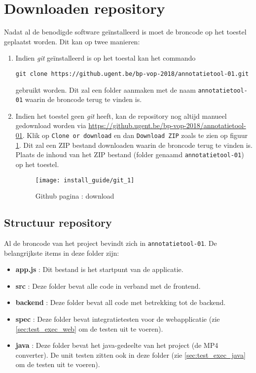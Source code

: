 \section{Downloaden repository}
\label{sec:download_repository}
Nadat al de benodigde software ge\"installeerd is moet de broncode op het toestel geplaatst worden. Dit kan op twee manieren:
\begin{enumerate}
    \item Indien \textit{git} ge\"installeerd is op het toestal kan het commando 
    
    \texttt{git clone https://github.ugent.be/bp-vop-2018/annotatietool-01.git} 
    
    gebruikt worden. Dit zal een folder aanmaken met de naam \texttt{annotatietool-01} waarin de broncode terug te vinden is.
    
    \item Indien het toestel geen \textit{git}  heeft, kan de repository nog altijd manueel gedownload worden via \url{https://github.ugent.be/bp-vop-2018/annotatietool-01}. Klik op 
\texttt{Clone or download} en dan \texttt{Download ZIP} zoals te zien op figuur \ref{fig:git_1}. Dit zal een ZIP 
bestand downloaden waarin de broncode terug te vinden is. Plaats de inhoud van het ZIP bestand (folder genaamd \texttt{annotatietool-01}) op het toestel.
\begin{figure}[ht]
 \texttt{[image: install\_guide/git\_1]}
 \centering
 \caption{Github pagina : download}
 \label{fig:git_1}
\end{figure}
\end{enumerate}

\subsection{Structuur repository}
Al de broncode van het project bevindt zich in \texttt{annotatietool-01}. De belangrijkste items in deze folder zijn:
\begin{itemize}
 \item \textbf{app.js} : Dit bestand is het startpunt van de applicatie.
 \item \textbf{src}    : Deze folder bevat alle code in verband met de frontend.
 \item \textbf{backend} : Deze folder bevat all code met betrekking tot de backend.
 \item \textbf{spec}    : Deze folder bevat integratietesten voor de webapplicatie (zie \ref{sec:test_exec_web} om de testen uit te voeren).
 \item \textbf{java}    : Deze folder bevat het java-gedeelte van het project (de MP4 converter). De unit testen zitten ook in deze folder (zie \ref{sec:test_exec_java} om de testen uit te voeren).
\end{itemize}




